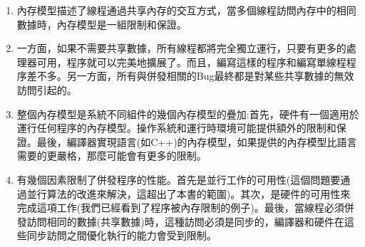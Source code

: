 \begin{enumerate}
\item 
內存模型描述了線程通過共享內存的交互方式，當多個線程訪問內存中的相同數據時，內存模型是一組限制和保證。

\item 
一方面，如果不需要共享數據，所有線程都將完全獨立運行，只要有更多的處理器可用，程序就可以完美地擴展了。而且，編寫這樣的程序和編寫單線程程序差不多。另一方面，所有與併發相關的Bug最終都是對某些共享數據的無效訪問引起的。

\item 
整個內存模型是系統不同組件的幾個內存模型的疊加:首先，硬件有一個適用於運行任何程序的內存模型。操作系統和運行時環境可能提供額外的限制和保證。最後，編譯器實現語言(如C++)的內存模型，如果提供的內存模型比語言需要的更嚴格，那麼可能會有更多的限制。

\item
有幾個因素限制了併發程序的性能。首先是並行工作的可用性(這個問題要通過並行算法的改進來解決，這超出了本書的範圍)。其次，是硬件的可用性來完成這項工作(我們已經看到了程序被內存限制的例子)。最後，當線程必須併發訪問相同的數據(共享數據)時，這種訪問必須是同步的，編譯器和硬件在這些同步訪問之間優化執行的能力會受到限制。

\end{enumerate}